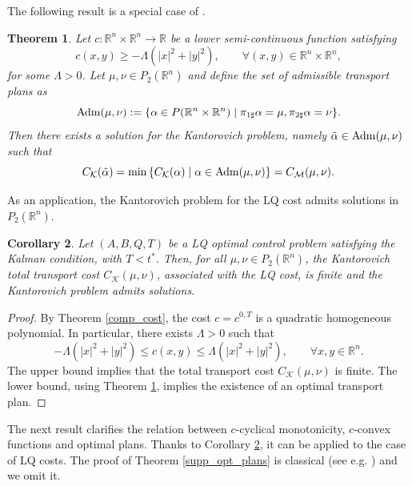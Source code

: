 \documentclass[reqno]{amsart}
\theoremstyle{plain}
\newtheorem{thm}{Theorem}[section]
\newtheorem{cor}[thm]{Corollary}
\theoremstyle{definition}
\theoremstyle{remark}
\newcommand{\Adm}{{\rm Adm}}
\newcommand{\R}{\mathbb{R}}
\begin{document}
        The following result is a special case of \cite[Theorem 4.1]{Villanioldandnew}.
		\begin{thm}\label{existence_optimal_plans}
		Let $c:\mathbb{R}^n\times\mathbb{R}^n\to\mathbb{R}$ be a lower semi-continuous function satisfying 
		\begin{equation}\label{hyp_quadratic}
			c(x,y)\geq -\Lambda(|x|^2+|y|^2),\qquad\forall(x,y)\in\mathbb{R}^n\times\mathbb{R}^n,
		\end{equation}
		for some $\Lambda>0$. Let $\mu,\nu\in P_2(\mathbb{R}^n)$ and define the set of  admissible transport plans as 
		\begin{equation}
			\Adm(\mu,\nu):=\{\alpha\in P(\mathbb{R}^n\times\mathbb{R}^n)\mid  \pi_{1\sharp}\alpha=\mu,\pi_{2\sharp}\alpha=\nu\}.
		\end{equation}  
		Then there exists a solution for the Kantorovich problem, namely $\tilde{\alpha}\in\Adm(\mu,\nu)$ such that
		\begin{equation}
			C_{\mathcal{K}}(\tilde{\alpha})=\min\left\{C_{\mathcal{K}}(\alpha)\mid \alpha\in\Adm(\mu,\nu)\right\}=C_{\mathcal{M}}(\mu,\nu).
		\end{equation}
		\end{thm}
        As an application, the Kantorovich problem for the LQ cost admits solutions in $P_2(\mathbb{R}^n)$. 
		\begin{cor}\label{finite_total_cost}
			Let $(A,B,Q,T)$ be a LQ optimal control problem satisfying the Kalman condition, with $T<t^*$. Then, for all $\mu,\nu\in P_2(\mathbb{R}^n)$, the Kantorovich total transport cost $C_{\mathcal{K}}(\mu,\nu)$, associated with the LQ cost, is finite and the Kantorovich problem admits solutions.
		\end{cor}
		\begin{proof}
            By Theorem \ref{comp_cost}, the cost $c=c^{0,T}$ is a quadratic homogeneous polynomial. In particular, there exists $\Lambda>0$ such that 
			\begin{equation}\label{quadratic_bound_LQ_cost}
				-\Lambda (|x|^2+|y|^2) \leq c(x,y) \leq \Lambda (|x|^2+|y|^2),\qquad \forall x,y\in\R^n.
			\end{equation}
            The upper bound implies that the total transport cost $C_{\mathcal{K}}(\mu,\nu)$ is finite. The lower bound, using Theorem \ref{existence_optimal_plans}, implies the existence of an optimal transport plan.
		\end{proof}


        The next result clarifies the relation between $c$-cyclical monotonicity, $c$-convex functions and optimal plans. Thanks to Corollary \ref{finite_total_cost}, it can be applied to the case of LQ costs.  The proof of Theorem \ref{supp_opt_plans} is classical (see e.g. \cite[Theorem 5.10]{Villanioldandnew}) and we omit it.
        
\end{document}

